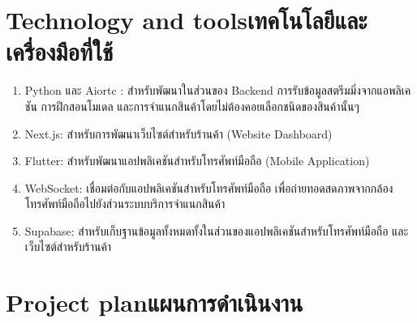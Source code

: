 \section{\ifenglish Technology and tools\else เทคโนโลยีและเครื่องมือที่ใช้\fi}
\begin{enumerate}
    \item Python และ Aiortc : สำหรับพัฒนาในส่วนของ Backend การรับข้อมูลสตรีมมิ่งจากแอพลิเคชัน การฝึกสอนโมเดล และการจำแนกสินค้าโดยไม่ต้องคอยเลือกชนิดของสินค้านั้นๆ
    \item Next.js: สําหรับการพัฒนาเว็บไซต์สำหรับร้านค้า (Website Dashboard)
    \item Flutter: สำหรับพัฒนาแอปพลิเคชันสำหรับโทรศัพท์มือถือ (Mobile Application)
    \item WebSocket: เชื่อมต่อกับแอปพลิเคชันสำหรับโทรศัพท์มือถือ เพื่อถ่ายทอดสดภาพจากกล้องโทรศัพท์มือถือไปยังส่วนระบบบริการจำแนกสินค้า
    \item Supabase: สําหรับเก็บฐานข้อมูลทั้งหมดทั้งในส่วนของแอปพลิเคชันสำหรับโทรศัพท์มือถือ และเว็บไซต์สำหรับร้านค้า

\end{enumerate}



\section{\ifenglish Project plan\else แผนการดำเนินงาน\fi}
%  


